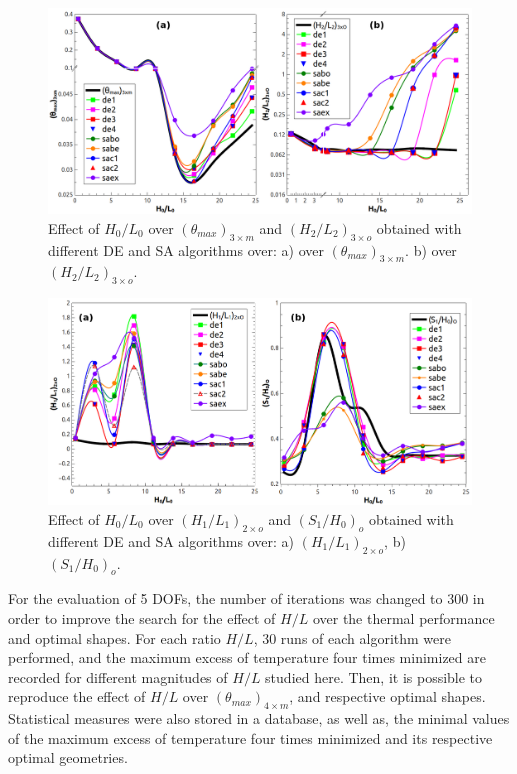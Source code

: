 \documentclass[12pt,fleqn]{article}
\begin{document}
\begin{figure}[H]
\centering
\includegraphics[width=0.9\linewidth]{imgs/4dof/de_sa_h0l0-tmin-4dof.png}
\caption{ {\small Effect of $H_{0}/L_{0}$ over $({\theta}_{max})_{3\times m}$ and $(H_{2}/L_{2})_{3\times o}$ obtained with different DE and SA algorithms over:  a) over $({\theta}_{max})_{3\times m}$. b) over $(H_{2}/L_{2})_{3\times o}$. }}
\label{figure02}
\end{figure}

\begin{figure}[H]
\centering
\includegraphics[width=0.9\linewidth]{imgs/4dof/de_sa_h0l0-h1l1-s1h0-4dof.png}
\caption{ {\small Effect of $H_{0}/L_{0}$ over $(H_{1}/L_{1})_{2\times o}$ and $(S_{1}/H_{0})_{o}$ obtained with different DE and SA algorithms over: a) $(H_{1}/L_{1})_{2\times o}$, b) $(S_{1}/H_{0})_{o}$. }}
\label{figure03}
\end{figure}

For the evaluation of 5 DOFs, the number of iterations was changed to 300 in order to improve the search for the effect of $H/L$ over the thermal performance and optimal shapes. For each ratio $H/L$, 30 runs of each algorithm were performed, and the maximum excess of temperature four times minimized are recorded for different magnitudes of $H/L$ studied here. Then, it is possible to reproduce the effect of $H/L$ over $({\theta}_{max})_{4\times m}$, and respective optimal shapes. Statistical measures were also stored in a database, as well as, the minimal values of the maximum excess of temperature four times minimized and its respective optimal geometries.
\end{document}
